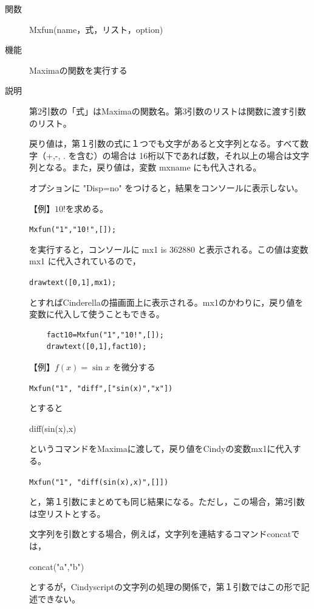 \documentclass[papersize,a4paper,12pt,uplatex]{jsarticle}
\begin{document}
\begin{description}

\vspace{\baselineskip}
\hypertarget{mxfun}{}
\item[関数]  Mxfun(name，式，リスト，option)
\item[機能]  Maximaの関数を実行する
\item[説明]  第2引数の「式」はMaximaの関数名。第3引数のリストは関数に渡す引数のリスト。

戻り値は，第１引数の式に１つでも文字があると文字列となる。すべて数字（+,-, . を含む）の場合は
16桁以下であれば数，それ以上の場合は文字列となる。また，戻り値は，変数 mxname にも代入される。

オプションに "Disp=no" をつけると，結果をコンソールに表示しない。

\vspace{\baselineskip}
【例】$10!$を求める。

    \verb|Mxfun("1","10!",[]);|
    
  を実行すると，コンソールに  mx1 is 362880 と表示される。この値は変数 mx1 に代入されているので，
  
    \verb|drawtext([0,1],mx1);|
    
とすればCinderellaの描画面上に表示される。mx1のかわりに，戻り値を変数に代入して使うこともできる。

\begin{verbatim}
    fact10=Mxfun("1","10!",[]);
    drawtext([0,1],fact10);
\end{verbatim}

\vspace{\baselineskip}
【例】$f(x)=\sin x$ を微分する

      \verb|Mxfun("1", "diff",["sin(x)","x"])|
      
  とすると
  
    diff(sin(x),x)
    
  というコマンドをMaximaに渡して，戻り値をCindyの変数mx1に代入する。
  
      \verb|Mxfun("1", "diff(sin(x),x)",[]])|
      
  と，第１引数にまとめても同じ結果になる。ただし，この場合，第2引数は空リストとする。
  
  文字列を引数とする場合，例えば，文字列を連結するコマンドconcatでは，
  
      concat("a","b")
      
  とするが，Cindyscriptの文字列の処理の関係で，第１引数ではこの形で記述できない。
  

\end{description}
\end{document}

